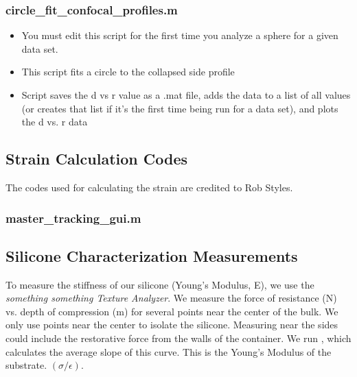 \subsubsection*{circle\_fit\_confocal\_profiles.m}
\begin{itemize}
	\item You must edit this script for the first time you analyze a sphere for a given data set.
	\item This script fits a circle to the collapsed side profile
	\item Script saves the d vs r value as a .mat file, adds the \code{[d,r]} data to a list of all \code{[d,r]} values (or creates that list if it's the first time being run for a data set), and plots the d vs. r data
\end{itemize}

\subsection{Strain Calculation Codes}
The codes used for calculating the strain are credited to Rob Styles.  

\subsubsection{master\_tracking\_gui.m}


\subsection{Silicone Characterization Measurements}
To measure the stiffness of our silicone (Young's Modulus, E), we use the \emph{something something Texture Analyzer}. We measure the force of resistance (N) vs. depth of compression (m) for several points near the center of the bulk. We only use points near the center to isolate the silicone. Measuring near the sides could include the restorative force from the walls of the container. We run , which calculates the average slope of this curve. This is the Young's Modulus of the substrate.  $(\sigma/\epsilon)$.